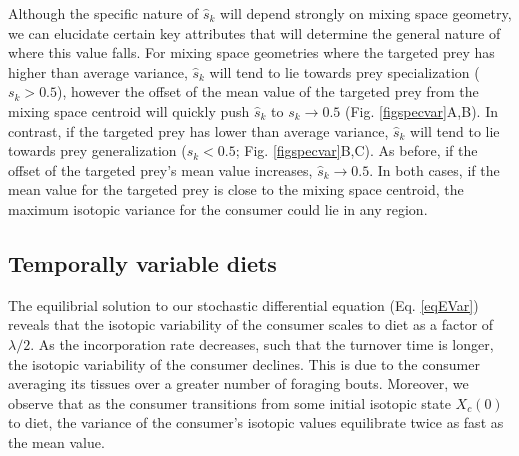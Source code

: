 \documentclass{frontiersSCNS}
\begin{document}
Although the specific nature of $\hat s_k$ will depend strongly on mixing space geometry, we can elucidate certain key attributes that will determine the general nature of where this value falls.
For mixing space geometries where the targeted prey has higher than average variance, $\hat s_k$ will tend to lie towards prey specialization ($s_k>0.5$), however the offset of the mean value of the targeted prey from the mixing space centroid will quickly push $\hat s_k$ to $s_k \to 0.5$ (Fig. \ref{figspecvar}A,B).
In contrast, if the targeted prey has lower than average variance, $\hat s_k$ will tend to lie towards prey generalization ($s_k < 0.5$; Fig. \ref{figspecvar}B,C).
As before, if the offset of the targeted prey's mean value increases, $\hat s_k \to 0.5$.
In both cases, if the mean value for the targeted prey is close to the mixing space centroid, the maximum isotopic variance for the consumer could lie in any region.




\subsection*{Temporally variable diets}
The equilibrial solution to our stochastic differential equation (Eq. \ref{eqEVar}) reveals that the isotopic variability of the consumer scales to diet as a factor of $\lambda/2$.
As the incorporation rate decreases, such that the turnover time is longer, the isotopic variability of the consumer declines.
This is due to the consumer averaging its tissues over a greater number of foraging bouts.
Moreover, we observe that as the consumer transitions from some initial isotopic state $X_c(0)$ to diet, the variance of the consumer's isotopic values equilibrate twice as fast as the mean value.
\end{document}
